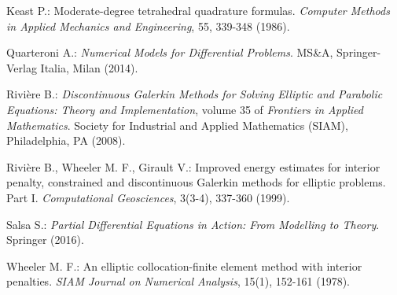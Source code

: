 \documentclass[12pt, a4paper]{article}
\theoremstyle{definition}
\theoremstyle{plain}
\theoremstyle{plain}
\theoremstyle{definition}
\begin{document}
\begin{thebibliography}{99}
	Keast P.: Moderate-degree tetrahedral quadrature formulas. \emph{Computer 
	Methods in Applied Mechanics and Engineering}, 55, 339-348 (1986).
	
	Quarteroni A.: \emph{Numerical Models for Differential Problems}. MS\&A, 
	Springer-Verlag Italia, Milan (2014).
	
	Rivière B.: \emph{Discontinuous Galerkin Methods for Solving Elliptic and 
	Parabolic Equations: Theory and Implementation}, volume 35 of 
	\emph{Frontiers in Applied Mathematics}. Society for Industrial and Applied 
	Mathematics (SIAM), Philadelphia, PA (2008).
	
	Rivière B., Wheeler M. F., Girault V.: Improved energy estimates for 
	interior penalty, constrained and discontinuous Galerkin methods for 
	elliptic problems. Part I. \emph{Computational Geosciences}, 3(3-4), 
	337-360 (1999).
	
	Salsa S.: \emph{Partial Differential Equations in Action: From Modelling to 
	Theory}. Springer (2016).

	Wheeler M. F.: An elliptic collocation-finite element method with interior 
	penalties. \emph{SIAM Journal on Numerical Analysis}, 15(1), 152-161 (1978).
\end{thebibliography}
\end{document}
